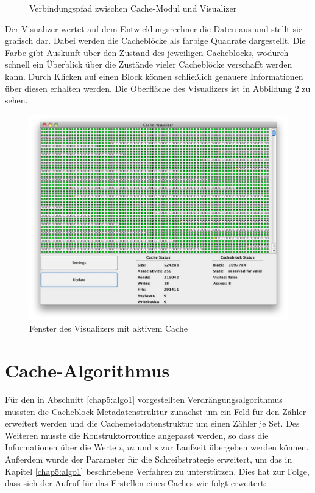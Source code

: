 \begin{figure}[H]\centering
    \caption[Verbindungspfad zwischen Cache-Modul und Visualizer]{Verbindungspfad zwischen Cache-Modul und Visualizer}
    \label{img:debug1}
\end{figure}

Der Visualizer wertet auf dem Entwicklungsrechner die Daten aus und stellt sie grafisch dar. Dabei werden die Cacheblöcke als farbige Quadrate dargestellt. Die
Farbe gibt Auskunft über den Zustand des jeweiligen Cacheblocks, wodurch schnell ein Überblick über die Zustände vieler Cacheblöcke verschafft werden kann.
Durch Klicken auf einen Block können schließlich genauere Informationen über diesen erhalten werden. Die Oberfläche des Visualizers ist in Abbildung \ref{img:debug2} zu sehen.

\begin{figure}[H]\centering
    \includegraphics[scale=0.45]{figures/chapter6/screen}
    \caption[Fenster des Visualizers mit aktivem Cache]{Fenster des Visualizers mit aktivem Cache}
    \label{img:debug2}
\end{figure}
\vspace{5mm}
\section{Cache-Algorithmus}
\label{chap6:algo}

Für den in Abschnitt \ref{chap5:algo1} vorgestellten Verdrängungsalgorithmus mussten die Cacheblock-Metadatenstruktur zunächst um ein Feld für den Zähler
erweitert werden und die Cachemetadatenstruktur um einen Zähler je Set. Des Weiteren musste die Konstruktorroutine angepasst werden, so dass die Informationen
über die Werte $i$, $m$ und $s$ zur Laufzeit übergeben werden können. Außerdem wurde der Parameter für die Schreibstrategie erweitert, um das in Kapitel
\ref{chap5:algo1} beschriebene Verfahren zu unterstützen. Dies hat zur Folge, dass sich der Aufruf für das Erstellen eines Caches wie folgt erweitert:

